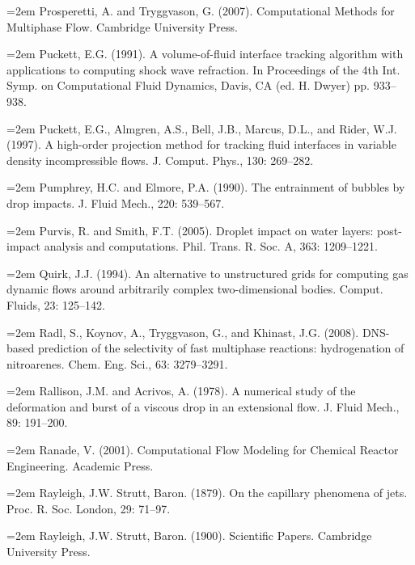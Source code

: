 \documentclass[11pt,a4paper,openany,fontset=none]{ctexbook}
\begin{document}
\par\hangindent=2em Prosperetti, A. and Tryggvason, G. (2007). Computational Methods for Multiphase Flow. Cambridge University Press.

\par\hangindent=2em Puckett, E.G. (1991). A volume-of-fluid interface tracking algorithm with applications to computing shock wave refraction. In Proceedings of the 4th Int. Symp. on Computational Fluid Dynamics, Davis, CA (ed. H. Dwyer) pp. 933--938.

\par\hangindent=2em Puckett, E.G., Almgren, A.S., Bell, J.B., Marcus, D.L., and Rider, W.J. (1997). A high-order projection method for tracking fluid interfaces in variable density incompressible flows. J. Comput. Phys., 130: 269--282.

\par\hangindent=2em Pumphrey, H.C. and Elmore, P.A. (1990). The entrainment of bubbles by drop impacts. J. Fluid Mech., 220: 539--567.

\par\hangindent=2em Purvis, R. and Smith, F.T. (2005). Droplet impact on water layers: post-impact analysis and computations. Phil. Trans. R. Soc. A, 363: 1209--1221.

\par\hangindent=2em Quirk, J.J. (1994). An alternative to unstructured grids for computing gas dynamic flows around arbitrarily complex two-dimensional bodies. Comput. Fluids, 23: 125--142.

\par\hangindent=2em Radl, S., Koynov, A., Tryggvason, G., and Khinast, J.G. (2008). DNS-based prediction of the selectivity of fast multiphase reactions: hydrogenation of nitroarenes. Chem. Eng. Sci., 63: 3279--3291.

\par\hangindent=2em Rallison, J.M. and Acrivos, A. (1978). A numerical study of the deformation and burst of a viscous drop in an extensional flow. J. Fluid Mech., 89: 191--200.

\par\hangindent=2em Ranade, V. (2001). Computational Flow Modeling for Chemical Reactor Engineering. Academic Press.

\par\hangindent=2em Rayleigh, J.W. Strutt, Baron. (1879). On the capillary phenomena of jets. Proc. R. Soc. London, 29: 71--97.

\par\hangindent=2em Rayleigh, J.W. Strutt, Baron. (1900). Scientific Papers. Cambridge University Press.
\end{document}
